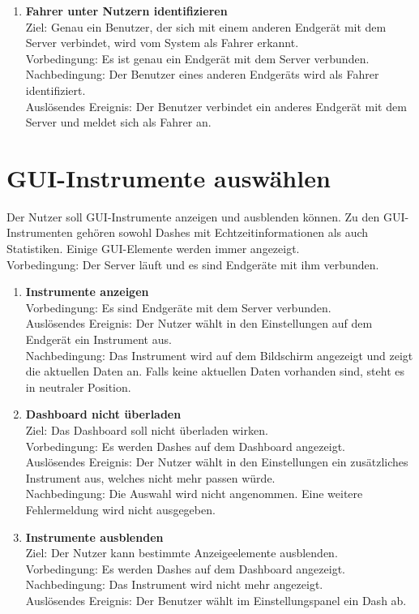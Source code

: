 \documentclass[pflichtenheft.tex]{subfiles}
\begin{document}
\begin{enumerate}
		\item{\textbf{Fahrer unter Nutzern identifizieren}} \label{driver2}
		\\ Ziel: Genau ein Benutzer, der sich mit einem anderen Endgerät mit dem Server verbindet, wird vom System als Fahrer erkannt.  \\
		Vorbedingung: Es ist genau ein Endgerät mit dem Server verbunden.\\
		Nachbedingung: Der Benutzer eines anderen Endgeräts wird als Fahrer identifiziert. \\
		Auslösendes Ereignis: Der Benutzer verbindet ein anderes Endgerät mit dem Server und meldet sich als Fahrer an.

		\setcounter{enumTemp}{\value{enumi}}
		

	\end{enumerate}
	
	\section{GUI-Instrumente auswählen}
	Der Nutzer soll GUI-Instrumente anzeigen und ausblenden können. Zu den GUI-Instrumenten gehören sowohl Dashes mit Echtzeitinformationen als auch Statistiken. Einige GUI-Elemente werden immer angezeigt.\\
	Vorbedingung: Der Server läuft und es sind Endgeräte mit ihm verbunden.
	
	\begin{enumerate}
	\setcounter{enumi}{\value{enumTemp}}
		\item{\textbf{Instrumente anzeigen}} \\Vorbedingung: Es sind Endgeräte mit dem Server verbunden.\\ Auslösendes Ereignis: Der Nutzer wählt in den Einstellungen auf dem Endgerät ein Instrument aus.\\ Nachbedingung: Das Instrument wird auf dem Bildschirm angezeigt und zeigt die aktuellen Daten an. Falls keine aktuellen Daten vorhanden sind, steht es in neutraler Position.
		\item{\textbf{Dashboard nicht überladen}} \\Ziel: Das Dashboard soll nicht überladen wirken.\\
		Vorbedingung: Es werden Dashes auf dem Dashboard angezeigt. \\Auslösendes Ereignis: Der Nutzer wählt in den Einstellungen ein zusätzliches Instrument aus, welches nicht mehr passen würde.\\
		Nachbedingung: Die Auswahl wird nicht angenommen. Eine weitere Fehlermeldung wird nicht ausgegeben.
		\item{\textbf{Instrumente ausblenden}} \\
		Ziel: Der Nutzer kann bestimmte Anzeigeelemente ausblenden.\\
		Vorbedingung: Es werden Dashes auf dem Dashboard angezeigt.\\
		Nachbedingung: Das Instrument wird nicht mehr angezeigt.\\
		Auslösendes Ereignis: Der Benutzer wählt im Einstellungspanel ein Dash ab.
		\setcounter{enumTemp}{\value{enumi}}
	\end{enumerate} 
	
\end{document}
